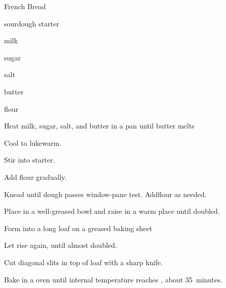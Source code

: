 \begin{recipe}{French Bread}{}{}

\begin{ingredients}
\item {} sourdough starter
\item \C{\half} milk
\item \Tp{1\eighth} sugar
\item \tp{2\quarter} salt
\item \C{\eighth} butter 
\item \C{1\twothird} flour
\end{ingredients}

\begin{directions}

\item Heat milk, sugar, salt, and butter in a pan until butter melts
\item Cool to lukewarm.

\item Stir into starter.
\item Add flour gradually.

\item Knead until dough passes window-pane test. Addflour as needed.

\item Place in a well-greased bowl and raise in a warm place until doubled.

\item Form into a long loaf on a greased baking sheet

\item Let rise again, until almost doubled.

\item Cut diagonal slits in top of loaf with a sharp knife.

\item Bake in a  oven until internal temperature reaches , about 35~minutes.

\end{directions}
\end{recipe}
